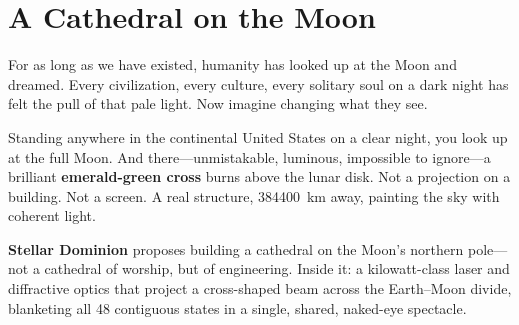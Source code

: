 \documentclass[12pt,letterpaper]{article}
\begin{document}
\newpage
\begin{abstract}
\noindent
Stellar Dominion integrates a \SI{3}{\kilo\watt}--\SI{5}{\kilo\watt}
emerald-green fiber laser directly into a SpaceX Starship HLS that lands
permanently on the lunar north pole. The Starship becomes the operational base:
its \SI{50}{\meter} stainless steel hull provides structure, thermal mass, and
mounting area for SolAero IMM-\(\alpha\) solar panels. A deployable boom
extends the laser, telescope, and diffractive optical element from the top of
the vehicle, pointing horizontally toward Earth. The cross fires every Sunday
when the Moon is visible at night over the US, with aspirational first light on
Easter Sunday, April~1, 2027. Total system mass is \SI{1.4}{\tonne}---a 39\%
reduction over a standalone pallet design. Core project cost is
\$42--114 million (projector, energy system, Starship modifications, and
ground systems), with a Starship lunar cargo flight adding \$20--50 million
if purchased separately. Total lifecycle cost including launch and ten years
of operations is \$72--192 million.
\end{abstract}

\tableofcontents
\newpage

\section{A Cathedral on the Moon}

For as long as we have existed, humanity has looked up at the Moon and dreamed.
Every civilization, every culture, every solitary soul on a dark night has felt
the pull of that pale light. Now imagine changing what they see.

Standing anywhere in the continental United States on a clear night, you look
up at the full Moon. And there---unmistakable, luminous, impossible to
ignore---a brilliant \textbf{\color{emerald}emerald-green cross} burns above
the lunar disk. Not a projection on a building. Not a screen. A real structure,
\SI{384400}{\kilo\meter} away, painting the sky with coherent light.

\textbf{Stellar Dominion} proposes building a cathedral on the Moon's northern
pole---not a cathedral of worship, but of engineering. Inside it: a
kilowatt-class laser and diffractive optics that project a cross-shaped beam
across the Earth--Moon divide, blanketing all 48 contiguous states in a single,
shared, naked-eye spectacle.
\end{document}
